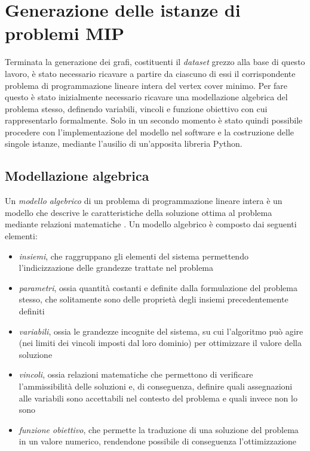 \section{Generazione delle istanze di problemi MIP}
Terminata la generazione dei grafi, costituenti il \textit{dataset} grezzo alla base di questo lavoro, è stato necessario ricavare a partire da ciascuno di essi il corrispondente problema di programmazione lineare intera del vertex cover minimo. Per fare questo è stato inizialmente necessario ricavare una modellazione algebrica del problema stesso, definendo variabili, vincoli e funzione obiettivo con cui rappresentarlo formalmente. Solo in un secondo momento è stato quindi possibile procedere con l'implementazione del modello nel software e la costruzione delle singole istanze, mediante l'ausilio di un'apposita libreria Python.

\subsection{Modellazione algebrica}
Un \textit{modello algebrico} di un problema di programmazione lineare intera è un modello che descrive le caratteristiche della soluzione ottima al problema mediante relazioni matematiche \cite{rop}. Un modello algebrico è composto dai seguenti elementi:
\begin{itemize}
\item \textsl{insiemi}, che raggruppano gli elementi del sistema permettendo l'indicizzazione delle grandezze trattate nel problema
\item \textsl{parametri}, ossia quantità costanti e definite dalla formulazione del problema stesso, che solitamente sono delle proprietà degli insiemi precedentemente definiti
\item \textsl{variabili}, ossia le grandezze incognite del sistema, su cui l'algoritmo può agire (nei limiti dei vincoli imposti dal loro dominio) per ottimizzare il valore della soluzione
\item \textsl{vincoli}, ossia relazioni matematiche che permettono di verificare l'ammissibilità delle soluzioni e, di conseguenza, definire quali assegnazioni alle variabili sono accettabili nel contesto del problema e quali invece non lo sono
\item \textsl{funzione obiettivo}, che permette la traduzione di una soluzione del problema in un valore numerico, rendendone possibile di conseguenza l'ottimizzazione
\end{itemize}

